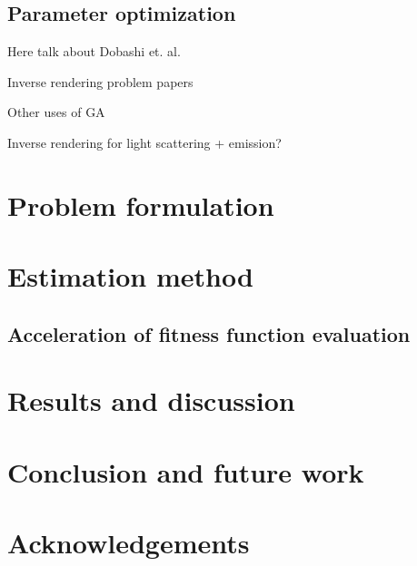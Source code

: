 \documentclass{acmsiggraph}
\begin{document}
\subsection{Parameter optimization}

Here talk about Dobashi et. al.

Inverse rendering problem papers

Other uses of GA

Inverse rendering for light scattering + emission?




\section{Problem formulation}

\section{Estimation method}

\subsection{Acceleration of fitness function evaluation}

\section{Results and discussion}

\section{Conclusion and future work}

\section*{Acknowledgements}


\nocite{*}

\end{document}
